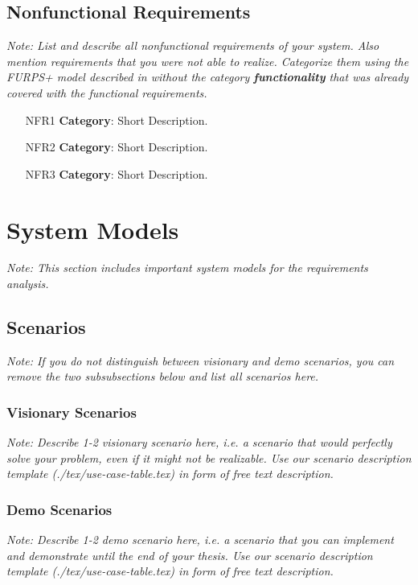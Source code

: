 \documentclass[a4paper,12pt,twoside]{report}
\begin{document}
\subsection{Nonfunctional Requirements}

\textit{Note: List and describe all nonfunctional requirements of your system. Also mention requirements that you were not able to realize. Categorize them using the FURPS+ model described in \cite{bruegge2004object} without the category \textbf{functionality} that was already covered with the functional requirements.}

\begin{itemize}
\item [NFR1] \textbf{Category}: Short Description.
\item [NFR2] \textbf{Category}: Short Description.
\item [NFR3] \textbf{Category}: Short Description.
\end{itemize}

\section{System Models}

\textit{Note: This section includes important system models for the requirements analysis.}

\subsection{Scenarios}

\textit{Note: If you do not distinguish between visionary and demo scenarios, you can remove the two subsubsections below and list all scenarios here.}

\subsubsection{Visionary Scenarios}

\textit{Note: Describe 1-2 visionary scenario here, i.e. a scenario that would perfectly solve your problem, even if it might not be realizable. Use our scenario description template (./tex/use-case-table.tex) in form of free text description.}

\subsubsection{Demo Scenarios}

\textit{Note: Describe 1-2 demo scenario here, i.e. a scenario that you can implement and demonstrate until the end of your thesis. Use our scenario description template (./tex/use-case-table.tex) in form of free text description.}
\end{document}
